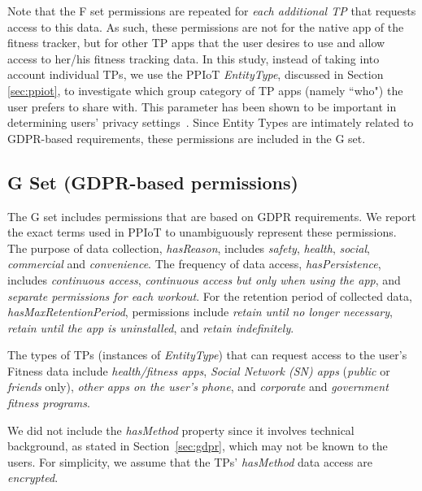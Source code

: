 Note that the F set permissions are repeated for \emph{each additional TP} that requests access to this data. As such, these permissions are not for the native app of the fitness tracker, but for other TP apps that the user desires to use and allow access to her/his fitness tracking data. In this study, instead of taking into account individual TPs, we use the PPIoT \textit{EntityType}, discussed in Section \ref{sec:ppiot}, to investigate which group category of TP apps (namely ``who") the user prefers to share with. This parameter has been shown to be important in determining users' privacy settings~\cite{lee2017privacy}. Since Entity Types are intimately related to GDPR-based requirements, these permissions are included in the G set. 

\subsection{G Set (GDPR-based permissions)}
\label{sec:gset}

The G set includes permissions that are based on GDPR requirements.  
We report the exact terms used in  PPIoT to unambiguously represent these permissions.  The purpose of data collection, \textit{hasReason}, includes \textit{safety}, \textit{health}, \textit{social}, \textit{commercial} and \textit{convenience}. The frequency of data access, \textit{hasPersistence}, includes \textit{continuous access}, \textit{continuous access but only when using the app}, and \textit{separate permissions for each workout}. For the retention period of collected data, \textit{hasMaxRetentionPeriod}, permissions include \textit{retain until no longer necessary}, \textit{retain until the app is uninstalled}, and \textit{retain indefinitely}. 

The types of TPs  (instances of \textit{EntityType}) that can request access to the user's Fitness data include \textit{health/fitness apps}, \textit{Social Network (SN) apps} (\textit{public} or \textit{friends} only), \textit{other apps on the user's phone}, and \textit{corporate} and \textit{government fitness programs}.

We did not include the \textit{hasMethod} property since it involves technical background, as stated in Section~\ref{sec:gdpr}, which may not be known to the users. For simplicity, we assume that the TPs' \textit{hasMethod} data access are \textit{encrypted}.



